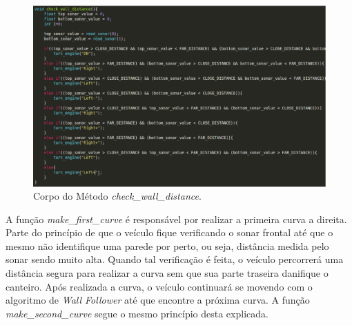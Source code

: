   \begin{figure}[!htbp]
  \begin{center}
  \includegraphics[width=1\textwidth]{figuras/check_wall_distance.eps}
  \caption{\label{fig:check_wall_distance}Corpo do Método \textit{check\_wall\_distance}.}
  \end{center}
  \end{figure}

  A função \textit{make\_first\_curve} é responsável por realizar a primeira curva a direita. Parte do princípio de que o veículo fique verificando o sonar frontal até que o mesmo não identifique uma parede por perto, ou seja, distância medida pelo sonar sendo muito alta. Quando tal verificação é feita, o veículo percorrerá uma distância segura para realizar a curva sem que sua parte traseira danifique o canteiro. Após realizada a curva, o veículo continuará se movendo com o algoritmo de \textit{Wall Follower} até que encontre a próxima curva. A função \textit{make\_second\_curve} segue o mesmo princípio desta explicada.

